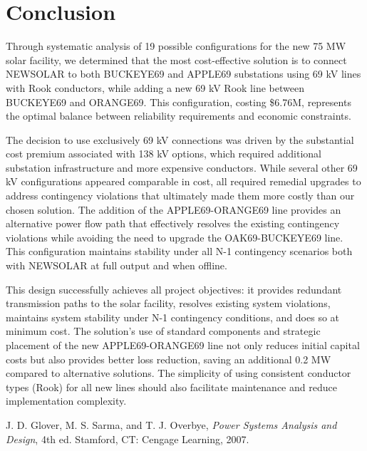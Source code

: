 \documentclass[conference]{IEEEtran}
\begin{document}
\section{Conclusion}
Through systematic analysis of 19 possible configurations for the new 75 MW solar facility, we determined that the most cost-effective solution is to connect NEWSOLAR to both BUCKEYE69 and APPLE69 substations using 69 kV lines with Rook conductors, while adding a new 69 kV Rook line between BUCKEYE69 and ORANGE69. This configuration, costing \$6.76M, represents the optimal balance between reliability requirements and economic constraints.

The decision to use exclusively 69 kV connections was driven by the substantial cost premium associated with 138 kV options, which required additional substation infrastructure and more expensive conductors. While several other 69 kV configurations appeared comparable in cost, all required remedial upgrades to address contingency violations that ultimately made them more costly than our chosen solution. The addition of the APPLE69-ORANGE69 line provides an alternative power flow path that effectively resolves the existing contingency violations while avoiding the need to upgrade the OAK69-BUCKEYE69 line. This configuration maintains stability under all N-1 contingency scenarios both with NEWSOLAR at full output and when offline.

This design successfully achieves all project objectives: it provides redundant transmission paths to the solar facility, resolves existing system violations, maintains system stability under N-1 contingency conditions, and does so at minimum cost. The solution's use of standard components and strategic placement of the new APPLE69-ORANGE69 line not only reduces initial capital costs but also provides better loss reduction, saving an additional 0.2 MW compared to alternative solutions. The simplicity of using consistent conductor types (Rook) for all new lines should also facilitate maintenance and reduce implementation complexity.
\begin{thebibliography}{9}
	 J. D. Glover, M. S. Sarma, and T. J. Overbye, \textit{Power Systems Analysis and Design}, 4th ed. Stamford, CT: Cengage Learning, 2007.
\end{thebibliography}
\end{document}
